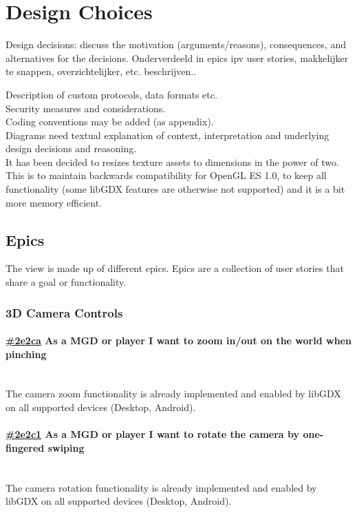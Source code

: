 \documentclass[10pt]{extarticle} %
\newcommand{\myparagraph}[1]{\paragraph{#1}\mbox{}\\} %
\begin{document}
    \section{Design Choices}
    Design decisions: discuss the motivation (arguments/reasons), consequences,
    and alternatives for the decisions.
    Onderverdeeld in epics ipv user stories, makkelijker te snappen, overzichtelijker, etc. beschrijven..

    Description of custom protocols, data formats etc.\\
    Security measures and considerations.\\
    Coding conventions may be added (as appendix).\\
    Diagrams need textual explanation of context, interpretation and underlying design decisions and reasoning.\\

    It has been decided to resizes texture assets to dimensions in the power of two.
    This is to maintain backwards compatibility for OpenGL ES 1.0, to keep all functionality (some libGDX features are otherwise not supported) and it is a bit more memory efficient.\cite{libgdxpottex}

    \subsection{Epics}
    The view is made up of different epics.
    Epics are a collection of user stories that share a goal or functionality.

    \newcommand{\clickup}[1]{https://app.clickup.com/757520/761304/t/#1}

    \subsubsection{3D Camera Controls}
    \myparagraph{\href{\clickup{2e2ca}}{\#2e2ca} As a MGD or player I want to zoom in/out on the world when pinching}
    The camera zoom functionality is already implemented and enabled by libGDX on all supported devices (Desktop, Android).
    \myparagraph{\href{\clickup{2e2c1}}{\#2e2c1} As a MGD or player I want to rotate the camera by one-fingered swiping}
    The camera rotation functionality is already implemented and enabled by libGDX on all supported devices (Desktop, Android).
\end{document}
